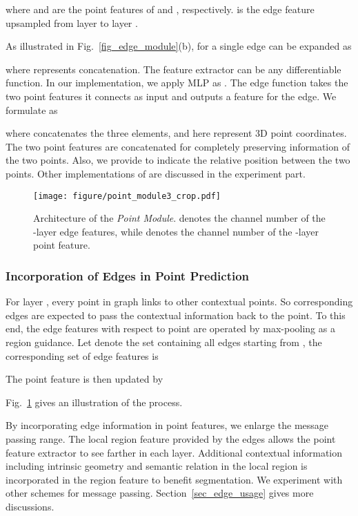\documentclass[10pt,twocolumn,letterpaper]{article}
\begin{document}
where  and  are the point features of  and , respectively.
 is the edge feature upsampled from layer  to layer .

As illustrated in Fig.~\ref{fig_edge_module}(b),   for a single edge can be expanded as

where  represents concatenation.
The feature extractor  can be any differentiable function. In our implementation, we apply MLP as . The edge function  takes the two point features it connects as input and outputs a feature for the edge. We formulate  as 

where  concatenates the three elements, and  here represent 3D point coordinates. The two point features are concatenated for completely preserving information of the two points. Also, we provide  to indicate the relative position between the two points. Other implementations of  are discussed in the experiment part.

\begin{figure}
	\begin{center}
		\texttt{[image: figure/point\_module3\_crop.pdf]}
	\end{center}
	\caption{Architecture of the \textit{Point Module}.  denotes the channel number of the -layer edge features, while  denotes the channel number of the -layer point feature.}
	\vspace{-2mm}
	\label{fig_point_module}
\end{figure}

\subsubsection{Incorporation of Edges in Point Prediction}
\label{sec_interaction}
For layer , every point in graph  links to other contextual points. So corresponding edges are expected to pass the contextual information back to the point. To this end, the edge features with respect to point  are operated by max-pooling as a region guidance. Let  denote the set containing all edges starting from , the corresponding set of edge features is

The point feature  is then updated by

Fig.~\ref{fig_point_module} gives an illustration of the process. 

By incorporating edge information in point features, we enlarge the message passing range. The local region feature provided by the edges allows the point feature extractor to see farther in each layer.
Additional contextual information including intrinsic geometry and semantic relation in the local region is incorporated in the region feature to benefit segmentation.
We experiment with other schemes for message passing. Section~\ref{sec_edge_usage} gives more discussions.
\end{document}

